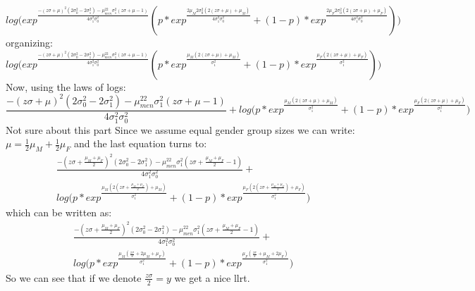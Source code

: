 \documentclass[12pt]{article}
\begin{document}
\begin{equation}
log\big(exp^{\frac{-(z\sigma + \mu)^2(2\sigma^2_0 - 2\sigma^2_1) - \mu_{men}^22\sigma^2_1(z\sigma + \mu-1)}{4\sigma^2_1\sigma^2_0}}(p*exp^{\frac{2\mu_M2\sigma_0^2(2(z\sigma + \mu) + \mu_M)}{4\sigma^2_1\sigma^2_0}} + (1-p)*exp^{\frac{2\mu_F2\sigma_0^2(2(z\sigma + \mu) + \mu_F)}{4\sigma^2_1\sigma^2_0}}) \big)
\end{equation}
organizing:
\begin{equation}
log\big(exp^{\frac{-(z\sigma + \mu)^2(2\sigma^2_0 - 2\sigma^2_1) - \mu_{men}^22\sigma^2_1(z\sigma + \mu-1)}{4\sigma^2_1\sigma^2_0}}
(p*exp^{\frac{\mu_M(2(z\sigma + \mu) + \mu_M)}{\sigma^2_1}} + 
(1-p)*exp^{\frac{\mu_F(2(z\sigma + \mu) + \mu_F)}{\sigma^2_1}}) \big)
\end{equation}
Now, using the laws of logs:
\begin{equation}
\frac{-(z\sigma + \mu)^2(2\sigma^2_0 - 2\sigma^2_1) - \mu_{men}^22\sigma^2_1(z\sigma + \mu-1)}{4\sigma^2_1\sigma^2_0} + log\big(p*exp^{\frac{\mu_M(2(z\sigma + \mu) + \mu_M)}{\sigma^2_1}} + 
(1-p)*exp^{\frac{\mu_F(2(z\sigma + \mu) + \mu_F)}{\sigma^2_1}}\big)
\end{equation}
{\color{red} Not sure about this part}
Since we assume equal gender group sizes we can write:
$\mu = \frac{1}{2}\mu_M + \frac{1}{2}\mu_F$
and the last equation turns to:
\begin{multline}
\frac{-(z\sigma + \frac{\mu_M + \mu_F}{2})^2(2\sigma^2_0 - 2\sigma^2_1) - \mu_{men}^22\sigma^2_1(z\sigma + \frac{\mu_M + \mu_F}{2}-1)}{4\sigma^2_1\sigma^2_0} + \\
log\big(p*exp^{\frac{\mu_M(2(z\sigma + \frac{\mu_M + \mu_F}{2}) + \mu_M)}{\sigma^2_1}} + 
(1-p)*exp^{\frac{\mu_F(2(z\sigma + \frac{\mu_M + \mu_F}{2}) + \mu_F)}{\sigma^2_1}}\big)
\end{multline}
which can be written as:
\begin{multline}
\frac{-(z\sigma + \frac{\mu_M + \mu_F}{2})^2(2\sigma^2_0 - 2\sigma^2_1) - \mu_{men}^22\sigma^2_1(z\sigma + \frac{\mu_M + \mu_F}{2}-1)}{4\sigma^2_1\sigma^2_0} + \\
log\big(p*exp^{\frac{\mu_M(\frac{z\sigma}{2} + 2\mu_M + \mu_F)}{\sigma^2_1}} + 
(1-p)*exp^{\frac{\mu_F(\frac{z\sigma}{2} + \mu_M + 2\mu_F)}{\sigma^2_1}}\big)
\end{multline}
So we can see that if we denote $\frac{z\sigma}{2} = y$ we get a nice llrt.
\end{document}
